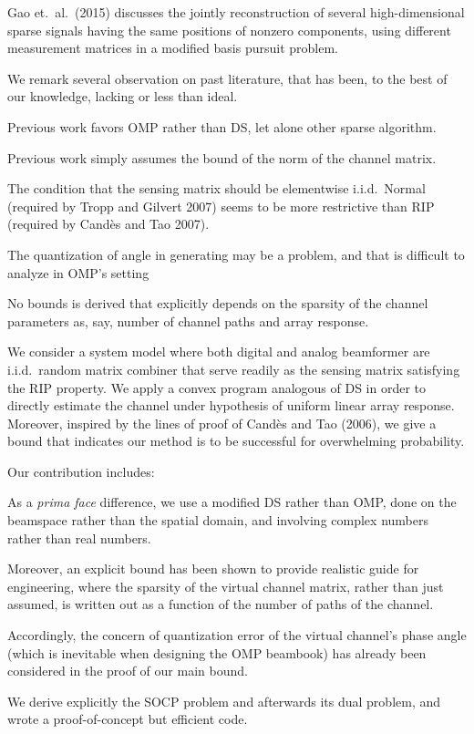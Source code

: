 Gao et.\ al.\ (2015) discusses the jointly reconstruction of several high-dimensional sparse signals having the same positions of nonzero components, using different measurement matrices in a modified basis pursuit problem.

We remark several observation on past literature, that has been, to the best of our knowledge, lacking or less than ideal.

\startitemize
\item Previous work favors OMP rather than DS, let alone other sparse algorithm.
\item Previous work simply assumes the bound of the norm of the channel matrix.
\item The condition that the sensing matrix should be elementwise i.i.d.\ Normal (required by Tropp and Gilvert 2007) seems to be more restrictive than RIP (required by Cand\`es and Tao 2007).
\item The quantization of angle in generating may be a problem, and that is difficult to analyze in OMP's setting
\item No bounds is derived that explicitly depends on the sparsity of the channel parameters as, say, number of channel paths and array response.
\stopitemize

\startsection [title={Our Contribution}]

We consider a system model where both digital and analog beamformer are i.i.d.\ random matrix combiner that serve readily as the sensing matrix satisfying the RIP property.
We apply a convex program analogous of DS in order to directly estimate the channel under hypothesis of uniform linear array response.
Moreover, inspired by the lines of proof of Cand\`es and Tao (2006), we give a bound that indicates our method is to be successful for overwhelming probability.

Our contribution includes:

\startitemize
\item As a {\it prima face} difference, we use a modified DS rather than OMP, done on the beamspace rather than the spatial domain, and involving complex numbers rather than real numbers.
\item Moreover, an explicit bound has been shown to provide realistic guide for engineering, where the sparsity of the virtual channel matrix, rather than just assumed, is written out as a function of the number of paths of the channel.
\item Accordingly, the concern of quantization error of the virtual channel's phase angle (which is inevitable when designing the OMP beambook) has already been considered in the proof of our main bound.
\item We derive explicitly the SOCP problem and afterwards its dual problem, and wrote a proof-of-concept but efficient code.
\stopitemize

\stopsection

\stopchapter

